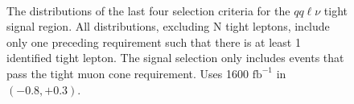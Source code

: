\begin{figure}[htpb]
\begin{minipage}{0.49\textwidth}
     \end{minipage}\\
     	\caption{ The distributions of the last four selection criteria for the $qq\ell\nu$ tight signal region. All distributions, excluding N tight leptons, include only one preceding requirement such that there is at least 1 identified tight lepton. The signal selection only includes events that pass the tight muon cone requirement. Uses 1600 $\text{fb}^{-1}$ in $(-0.8,+0.3)$.}
     	     \label{fig:cutflow2}

     



\end{figure}


